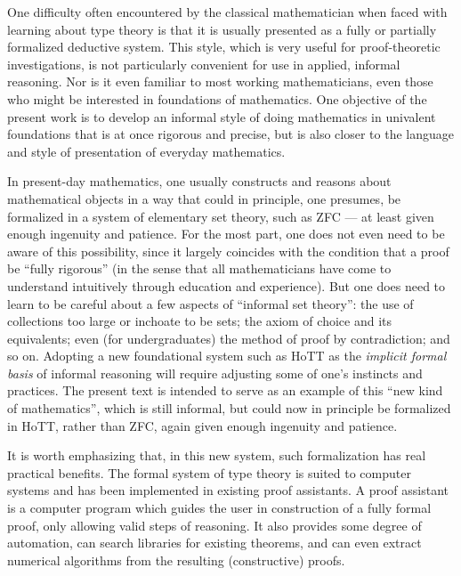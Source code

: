 One difficulty often encountered by the classical mathematician when faced with learning about type theory is that it is usually presented as a fully or partially formalized deductive system.
This style, which is very useful for proof-theoretic investigations, is not particularly convenient for use in applied, informal reasoning.
Nor is it even familiar to most working mathematicians, even those who might be interested in foundations of mathematics.
One objective of the present work is to develop an informal style of doing mathematics in univalent foundations that is at once rigorous and precise, but is also closer to the language and style of presentation of everyday mathematics.

In present-day mathematics, one usually constructs and reasons about mathematical objects in a way that could in principle, one presumes, be formalized in a system of elementary set theory, such as ZFC --- at least given enough ingenuity and patience.
For the most part, one does not even need to be aware of this possibility, since it largely coincides with the condition that a proof be ``fully rigorous'' (in the sense that all mathematicians have come to understand intuitively through education and experience).
But one does need to learn to be careful about a few aspects of ``informal set theory'': the use of collections too large or inchoate to be sets; the axiom of choice and its equivalents; even (for undergraduates) the method of proof by contradiction; and so on.
Adopting a new foundational system such as HoTT as the \emph{implicit formal basis} of informal reasoning will require adjusting some of one's instincts and practices.
The present text is intended to serve as an example of this ``new kind of mathematics'', which is still informal, but could now in principle be formalized in HoTT, rather than ZFC, again given enough ingenuity and patience.

It is worth emphasizing that, in this new system, such formalization has real practical benefits.
The formal system of type theory is suited to computer systems and has been implemented in existing proof assistants.
A proof assistant is a computer program which guides the user in construction of a fully formal proof, only allowing valid steps of reasoning.
It also provides some degree of automation, can search libraries for existing theorems, and can even extract numerical algorithms from the resulting (constructive) proofs.

